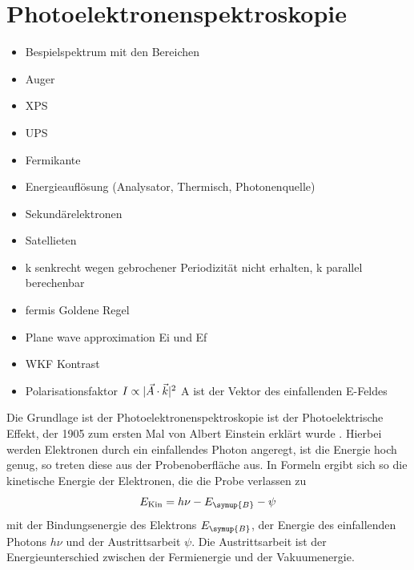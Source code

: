     \section{Photoelektronenspektroskopie} \label{sec:PES}
        \begin{itemize}
            \item Bespielspektrum mit den Bereichen
            \item Auger
            \item XPS
            \item UPS
            \item Fermikante
            \item Energieauflösung (Analysator, Thermisch, Photonenquelle)
            \item Sekundärelektronen
            \item Satellieten
            \item k senkrecht wegen gebrochener Periodizität nicht erhalten, k parallel berechenbar
            \item fermis Goldene Regel
            \item Plane wave approximation Ei und Ef
            \item WKF Kontrast
            \item Polarisationsfaktor $I \propto \lvert\vec{A} \cdot \vec{k}\rvert^2$ A ist der Vektor des einfallenden E-Feldes
        \end{itemize}
        Die Grundlage ist der Photoelektronenspektroskopie ist der Photoelektrische Effekt, der 1905 zum ersten Mal von Albert Einstein erklärt wurde \cite{Einstein}.
        Hierbei werden Elektronen durch ein einfallendes Photon angeregt, ist die Energie hoch genug, so treten diese aus der Probenoberfläche aus.
        In Formeln ergibt sich so die kinetische Energie der Elektronen, die die Probe verlassen zu 
        \begin{equation}
            E_{\text{Kin}} = h \nu - E_{\symup{B}} - \psi
            \label{eqn:Photoeffekt}
        \end{equation}
        mit der Bindungsenergie des Elektrons $E_{\symup{B}}$, der Energie des einfallenden Photons $h \nu$ und der Austrittsarbeit $\psi$.
        Die Austrittsarbeit ist der Energieunterschied zwischen der Fermienergie und der Vakuumenergie.

